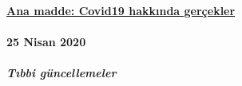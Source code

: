\hypertarget{ana-madde-covid19-hakkux131nda-geruxe7ekler}{%
\paragraph{\texorpdfstring{\href{https://swprs.org/isvicreli-bir-doktordan-kovid-19-uezerine/}{Ana
madde: Covid19 hakkında
gerçekler}}{Ana madde: Covid19 hakkında gerçekler}}\label{ana-madde-covid19-hakkux131nda-geruxe7ekler}}

\hypertarget{25-nisan-2020}{%
\paragraph{25 Nisan 2020}\label{25-nisan-2020}}

\hypertarget{tux131bbi-guxfcncellemeler}{%
\subparagraph{\texorpdfstring{\textbf{Tıbbi
güncellemeler}}{Tıbbi güncellemeler}}\label{tux131bbi-guxfcncellemeler}}

